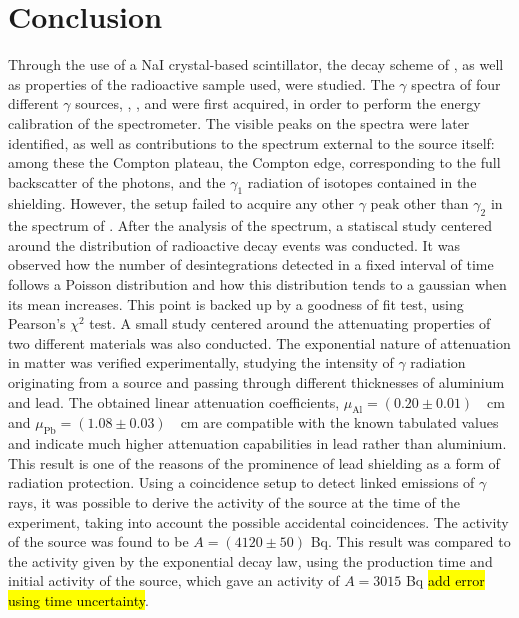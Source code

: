 \section{Conclusion}
Through the use of a NaI crystal-based scintillator, the decay scheme of \cobalt, as well as properties of the radioactive sample used, were studied.
The $\gamma$ spectra of four different $\gamma$ sources, \cesium, \cobalt, \lead and \hafnium were first acquired, in order to perform the energy calibration of the spectrometer.
The visible peaks on the spectra were later identified, as well as contributions to the spectrum external to the source itself:
among these the Compton plateau, the Compton edge, corresponding to the full backscatter of the photons, and the $\gamma_1$ radiation of \lead isotopes contained in the shielding.
However, the setup failed to acquire any other $\gamma$ peak other than $\gamma_2$ in the spectrum of \hafnium.
After the analysis of the spectrum, a statiscal study centered around the distribution of radioactive decay events was conducted.
It was observed how the number of desintegrations detected in a fixed interval of time follows a Poisson distribution and how this distribution tends to a gaussian when its mean increases.
This point is backed up by a goodness of fit test, using Pearson's \(\chi^2\) test.
A small study centered around the attenuating properties of two different materials was also conducted.
The exponential nature of attenuation in matter was verified experimentally, studying the intensity of $\gamma$ radiation originating from a \cesium source and passing through different thicknesses of aluminium and lead.
The obtained linear attenuation coefficients, \mbox{$\mu_{\mathrm{Al}} = (0.20 \pm 0.01)$ \unit{\per\cm}} and \mbox{$\mu_{\mathrm{Pb}} = (1.08 \pm 0.03)$ \unit{\per\cm}} are compatible with the known tabulated values and indicate much higher attenuation capabilities in lead rather than aluminium.
This result is one of the reasons of the prominence of lead shielding as a form of radiation protection.
Using a coincidence setup to detect linked emissions of \(\gamma\) rays, it was possible to derive the activity of the \cobalt source at the time of the experiment, taking into account the possible accidental coincidences.
The activity of the source was found to be $A = (4120 \pm 50)$ Bq.
This result was compared to the activity given by the exponential decay law, using the production time and initial activity of the source, which gave an activity of \(A = 3015\) Bq \hl{add error using time uncertainty}.
